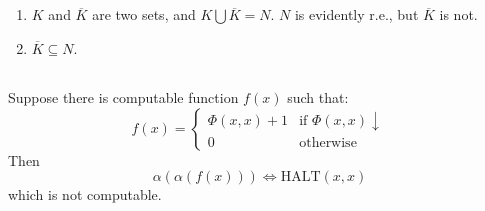 \subsection{}
\begin{enumerate}
  \item 
    $K$ and $\overline{K}$ are two sets,
    and $ K \bigcup \overline{K} = N $. $N$ is evidently r.e.,
    but $ \overline{K} $ is not.

  \item 
    $ \overline{K} \subseteq N $.
\end{enumerate}

\subsection{}
Suppose there is computable function $f(x)$ such that:
\[ f(x) =
     \begin{cases}
       \Phi(x,x)+1 & \text{if } \Phi(x,x)\downarrow \\
       0           & \text{otherwise}
     \end{cases} \]
Then
\[ \alpha(\alpha(f(x))) \Leftrightarrow \mathrm{HALT}(x,x) \]
which is not computable.


